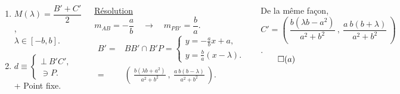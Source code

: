 \documentclass[10pt]{beamer}
\begin{document}
{\begin{columns}[t]
\begin{tcolorbox}[basic]
\begin{enumerate}
					\item $M(\lambda)=\dfrac{B' + C'}{2}$,\\ \smallskip $\lambda \in[-b,b]$. \\[0.6em]
				    
					\item $d\equiv      \begin{cases} 
							    \bot\ B'C', \\
							    \ni P.
							    \end{cases}$ \\ \smallskip
							    + Point fixe.  
				      \end{enumerate}

				    
				    \end{tcolorbox}
		
		
		\centering
		\underline{Résolution}\\ \flushleft
		$m_{AB} = -\dfrac{a}{b} \quad \rightarrow \quad m_{PB'}=\dfrac{b}{a}$. \\ \medskip
		\begin{align*}
		B'=&BB' \cap B'P= \begin{cases}
		                  y = -\frac{a}{b}x + a, \\
		                  y = \frac{b}{a}(x-\lambda).
		                  \end{cases} \\
		  =&(\ \frac{b(\lambda b+a^2)}{a^2 + b^2}\ ,\ \frac{a\ b(b-\lambda)}{a^2 + b^2}\ ).
		\end{align*} \smallskip
		
		
		De la même façon, \\ \medskip
		$C'=(\ \dfrac{b(\lambda b-a^2)}{a^2 + b^2}\ ,\ \dfrac{a\ b(b+\lambda)}{a^2 + b^2}\ )$. \\ \smallskip \hfill $\qed(a)$
		

\end{columns}}
\end{document}
